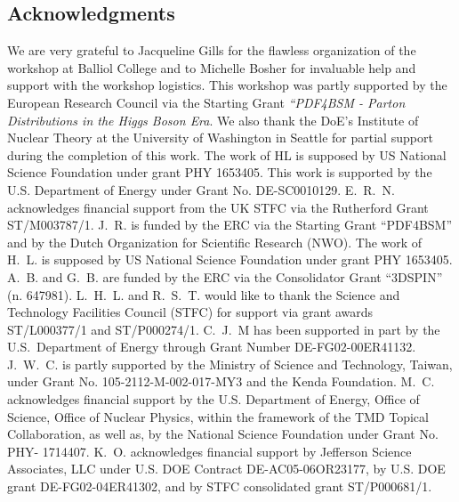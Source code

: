 \subsection*{Acknowledgments}

We are very grateful to Jacqueline Gills for the flawless organization
of the workshop at Balliol College and to Michelle Bosher for
invaluable help and support with the workshop logistics.
%
This workshop was partly supported by the European Research Council via
the Starting Grant {\it ``PDF4BSM - Parton Distributions in the
  Higgs Boson Era}.
%
We also thank the DoE's Institute of Nuclear Theory at the University of Washington
in Seattle for partial support during the completion of this work. 
%
The work of HL is supposed by US National Science Foundation
under grant PHY 1653405.
%
This work is supported by
the U.S. Department of Energy under Grant No. DE-SC0010129.
%
E.~R.~N. acknowledges financial support from the
UK STFC via the Rutherford Grant ST/M003787/1.
%
J.~R. is funded by the ERC via the Starting Grant ``PDF4BSM'' and by the
Dutch Organization for Scientific Research (NWO).
%
The work of H.~L. is supposed by US National Science Foundation under grant PHY 1653405. 
%
A.~B. and G.~B. are funded by the ERC via the Consolidator
Grant “3DSPIN” (n. 647981). 
%
L.~H.~L. and R.~S.~T. would like to thank the Science and Technology Facilities Council
(STFC) for support via grant awards ST/L000377/1 and ST/P000274/1. 
%
C.~J.~M has been supported in part by the U.S.~Department of Energy through
Grant Number DE-FG02-00ER41132.
%
J.~W.~C. is partly supported by the Ministry of Science and Technology, Taiwan,
under Grant No. 105-2112-M-002-017-MY3 and the Kenda Foundation.
%
M.~C. acknowledges financial support by the U.S. Department of Energy, Office of Science, Office of Nuclear Physics, within the framework of the TMD Topical Collaboration, as well as,
by the National Science Foundation under Grant No. PHY- 1714407. 
%
K.~O. 
acknowledges financial support  by Jefferson Science Associates, LLC under U.S. DOE Contract DE-AC05-06OR23177, by U.S. DOE grant DE-FG02-04ER41302, and  by STFC consolidated grant ST/P000681/1.
